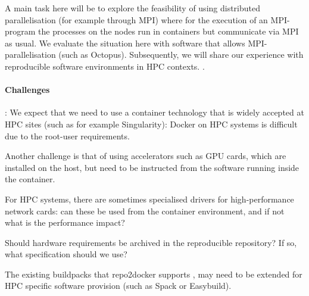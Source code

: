 \begin{task}
A main task here will be to explore the feasibility of using distributed
parallelisation (for example through MPI) where for the execution of an
MPI-program the processes on the nodes run in containers but communicate via MPI
as usual. We evaluate the situation here with software that allows
MPI-parallelisation (such as Octopus). Subsequently, we will share our experience with
reproducible software environments in HPC contexts. .

\paragraph*{Challenges}: We expect that we need to use a container technology
that is widely accepted at HPC sites (such as for example Singularity): Docker
on HPC systems is difficult due to the root-user requirements.

Another challenge is that of using accelerators such as GPU cards, which are
installed on the host, but need to be instructed from the software running
inside the container. 

For HPC systems, there are sometimes specialised drivers for high-performance
network cards: can these be used from the container environment, and if not what
is the performance impact?

Should hardware requirements be archived in the reproducible repository? If so,
what specification should we use?

The existing buildpacks that repo2docker supports , may need to be extended for HPC specific software
provision (such as Spack or Easybuild).


\end{task}

